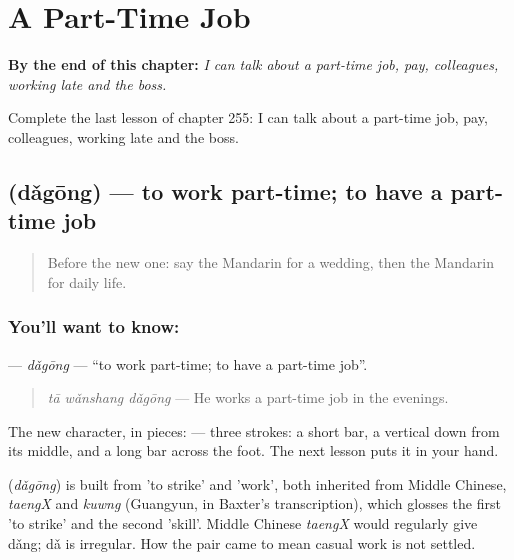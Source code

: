 
\chapter{A Part-Time Job}
\label{ch:zh-a-part-time-job}

\begin{chapteropening}
\textbf{By the end of this chapter:} \emph{I can talk about a part-time job, pay, colleagues, working late and the boss.}

Complete the last lesson of chapter 255: I can talk about a part-time job, pay, colleagues, working late and the boss.
\end{chapteropening}

\section[\texorpdfstring{\zh{打工} (dǎgōng)}{打工 (dǎgōng)}]{ (dǎgōng) — to work part-time; to have a part-time job}

\label{lesson:ZH-C255-dagong}



\begin{quote}
Before the new one: say the Mandarin for a wedding, then the Mandarin for daily life.
\end{quote}

\subsection*{You'll want to know: }
\textbf{} — \emph{dǎgōng} — \textquotedblleft{}to work part-time; to have a part-time job\textquotedblright{}.

\begin{quote}
\textbf{} \emph{tā wǎnshang dǎgōng} — He works a part-time job in the evenings.
\end{quote}

The new character, in pieces:  — three strokes: a short bar, a vertical down from its middle, and a long bar across the foot. The next lesson puts it in your hand.

\begin{cousinweb}
\textbf{} (\emph{dǎgōng}) is built from  'to strike' and  'work', both inherited from Middle Chinese, \emph{taengX} and \emph{kuwng} (Guangyun, in Baxter's transcription), which glosses the first 'to strike' and the second 'skill'. Middle Chinese \emph{taengX} would regularly give dǎng; dǎ is irregular. How the pair came to mean casual work is not settled.
\end{cousinweb}

